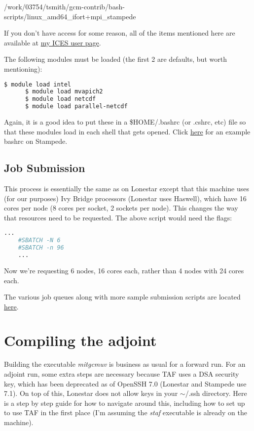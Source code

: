 \documentclass[a4paper,11pt]{article}
\begin{document}
	/work/03754/tsmith/gcm-contrib/bash-scripts/linux\_amd64\_ifort+mpi\_stampede

	If you don't have access for some reason, all of the items mentioned here are available at \href{http://users.ices.utexas.edu/~tsmith/bash-scripts/}{my ICES user page}.

	The following modules must be loaded (the first 2 are defaults, but worth mentioning): 

	\begin{lstlisting}[language=bash]
	  $ module load intel
	  $ module load mvapich2
	  $ module load netcdf
	  $ module load parallel-netcdf
	\end{lstlisting}

	Again, it is a good idea to put these in a \$HOME/.bashrc (or .cshrc, etc) file so that these modules load in each shell that gets opened. Click \href{http://users.ices.utexas.edu/~tsmith/bash-scripts/bashrc_tsmith_stampede}{here} for an example bashrc on Stampede.


	\subsection{Job Submission}

	This process is essentially the same as on Lonestar except that this machine uses (for our purposes) Ivy Bridge processors (Lonestar uses Haswell), which have 16 cores per node (8 cores per socket, 2 sockets per node). This changes the way that resources need to be requested. The above script would need the flags: 

	\begin{lstlisting}[language=bash]
	...
	#SBATCH -N 6
	#SBATCH -n 96
	...

	\end{lstlisting} 

	Now we're requesting 6 nodes, 16 cores each, rather than 4 nodes with 24 cores each. 

	The various job queues along with more sample submission scripts are located \href{https://portal.tacc.utexas.edu/user-guides/stampede#running}{here}.  

	\section{Compiling the adjoint} 
	Building the executable \textit{mitgcmuv} is business as usual for a forward run. For an adjoint run, some extra steps are necessary because TAF uses a DSA security key, which has been deprecated as of OpenSSH 7.0 (Lonestar and Stampede use 7.1). On top of this, Lonestar does not allow keys in your $\sim$/.ssh directory. Here is a step by step guide for how to navigate around this, including how to set up to use TAF in the first place (I'm assuming the \textit{staf} executable is already on the machine). 
\end{document}

